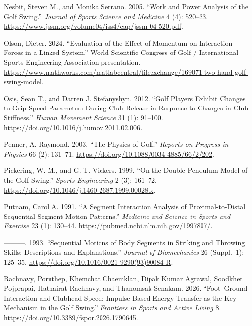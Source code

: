 \documentclass[
  letterpaper,
]{report}
\newlength{\cslhangindent}
\newenvironment{CSLReferences}[2] %
 {\begin{list}{}{%
  \setlength{\itemindent}{0pt}
  \setlength{\leftmargin}{0pt}
  \setlength{\parsep}{0pt}
  \ifodd #1
   \setlength{\leftmargin}{\cslhangindent}
   \setlength{\itemindent}{-1\cslhangindent}
  \fi
  \setlength{\itemsep}{#2\baselineskip}}}
 {\end{list}}
\begin{document}
\begin{CSLReferences}{1}{0}
Nesbit, Steven M., and Monika Serrano. 2005. {``Work and Power Analysis
of the Golf Swing.''} \emph{Journal of Sports Science and Medicine} 4
(4): 520--33.
\url{https://www.jssm.org/volume04/iss4/cap/jssm-04-520.pdf}.

Olson, Dieter. 2024. {``Evaluation of the Effect of Momentum on
Interaction Forces in a Linked System.''} World Scientific Congress of
Golf / International Sports Engineering Association presentation.
\url{https://www.mathworks.com/matlabcentral/fileexchange/169071-two-hand-golf-swing-model}.

Osis, Sean T., and Darren J. Stefanyshyn. 2012. {``Golf Players Exhibit
Changes to Grip Speed Parameters During Club Release in Response to
Changes in Club Stiffness.''} \emph{Human Movement Science} 31 (1):
91--100. \url{https://doi.org/10.1016/j.humov.2011.02.006}.

Penner, A. Raymond. 2003. {``The Physics of Golf.''} \emph{Reports on
Progress in Physics} 66 (2): 131--71.
\url{https://doi.org/10.1088/0034-4885/66/2/202}.

Pickering, W. M., and G. T. Vickers. 1999. {``On the Double Pendulum
Model of the Golf Swing.''} \emph{Sports Engineering} 2 (3): 161--72.
\url{https://doi.org/10.1046/j.1460-2687.1999.00028.x}.

Putnam, Carol A. 1991. {``A Segment Interaction Analysis of
Proximal-to-Distal Sequential Segment Motion Patterns.''} \emph{Medicine
and Science in Sports and Exercise} 23 (1): 130--44.
\url{https://pubmed.ncbi.nlm.nih.gov/1997807/}.

---------. 1993. {``Sequential Motions of Body Segments in Striking and
Throwing Skills: Descriptions and Explanations.''} \emph{Journal of
Biomechanics} 26 (Suppl.~1): 125--35.
\url{https://doi.org/10.1016/0021-9290(93)90084-R}.

Rachnavy, Pornthep, Khemchat Chaemklan, Dipak Kumar Agrawal, Soodkhet
Pojprapai, Hathairat Rachnavy, and Thanomsak Senakam. 2026.
{``Foot--Ground Interaction and Clubhead Speed: Impulse-Based Energy
Transfer as the Key Mechanism in the Golf Swing.''} \emph{Frontiers in
Sports and Active Living} 8.
\url{https://doi.org/10.3389/fspor.2026.1790645}.


\end{CSLReferences}
\end{document}
